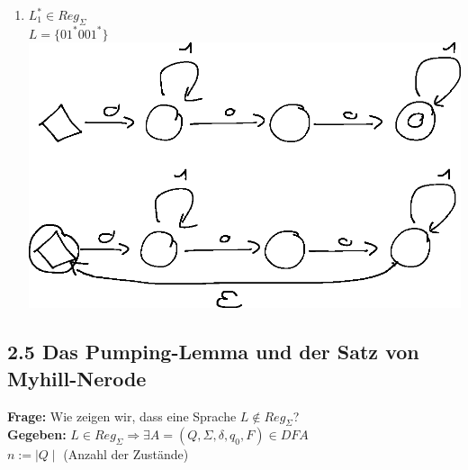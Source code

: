 \documentclass[10pt]{article}
\newcommand{\Bold}[1]{\textbf{#1}} %
\newcommand{\Ra}{\Rightarrow}
\begin{document}
\begin{enumerate}
 \item $L_1^*\in Reg_\Sigma$\\
 $L=\{01^*001^*\}$\\
\includegraphics{Bild16.eps}\\
\end{enumerate}
\subsection{2.5 Das Pumping-Lemma und der Satz von Myhill-Nerode}
\Bold{Frage:} Wie zeigen wir, dass eine Sprache $L\notin Reg_\Sigma$?\\
\Bold{Gegeben:} $L\in Reg_\Sigma\Ra\exists A=(Q,\Sigma,\delta,q_0,F)\in DFA$\\
$n:=\mid Q\mid$ (Anzahl der Zust\"ande)
\end{document}
